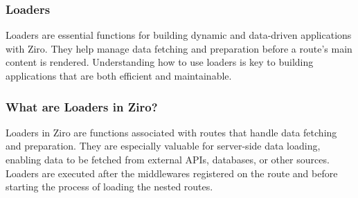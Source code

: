 

\subsubsection{Loaders}
Loaders are essential functions for building dynamic and data-driven applications with Ziro. They help manage data fetching and preparation before a route’s main content is rendered. Understanding how to use loaders is key to building applications that are both efficient and maintainable.

\subsubsection*{What are Loaders in Ziro?}
Loaders in Ziro are functions associated with routes that handle data fetching and preparation. They are especially valuable for server-side data loading, enabling data to be fetched from external APIs, databases, or other sources. Loaders are executed after the middlewares registered on the route and before starting the process of loading the nested routes.

\pagebreak
